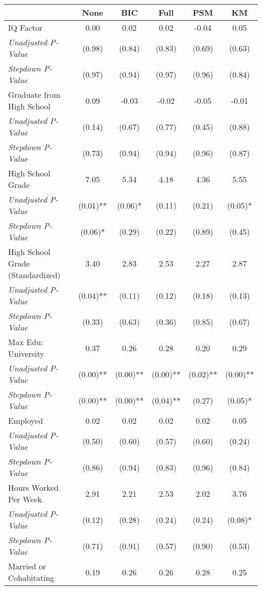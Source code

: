 \begin{tabular}{l c c c c c}
\toprule
 & None & BIC & Full & PSM & KM \\
\midrule
IQ Factor & 0.00 & 0.02 & 0.02 & -0.04 & 0.05 \\
\quad \textit{Unadjusted P-Value} & (0.98) & (0.84) & (0.83) & (0.69) & (0.63) \\
\quad \textit{Stepdown P-Value} & (0.97) & (0.94) & (0.97) & (0.96) & (0.84) \\
Graduate from High School & 0.09 & -0.03 & -0.02 & -0.05 & -0.01 \\
\quad \textit{Unadjusted P-Value} & (0.14) & (0.67) & (0.77) & (0.45) & (0.88) \\
\quad \textit{Stepdown P-Value} & (0.73) & (0.94) & (0.94) & (0.96) & (0.87) \\
High School Grade & 7.05 & 5.34 & 4.18 & 4.36 & 5.55 \\
\quad \textit{Unadjusted P-Value} & (0.01)** & (0.06)* & (0.11) & (0.21) & (0.05)* \\
\quad \textit{Stepdown P-Value} & (0.06)* & (0.29) & (0.22) & (0.89) & (0.45) \\
High School Grade (Standardized) & 3.40 & 2.83 & 2.53 & 2.27 & 2.87 \\
\quad \textit{Unadjusted P-Value} & (0.04)** & (0.11) & (0.12) & (0.18) & (0.13) \\
\quad \textit{Stepdown P-Value} & (0.33) & (0.63) & (0.36) & (0.85) & (0.67) \\
Max Edu: University & 0.37 & 0.26 & 0.28 & 0.20 & 0.29 \\
\quad \textit{Unadjusted P-Value} & (0.00)** & (0.00)** & (0.00)** & (0.02)** & (0.00)** \\
\quad \textit{Stepdown P-Value} & (0.00)** & (0.00)** & (0.04)** & (0.27) & (0.05)* \\
Employed & 0.02 & 0.02 & 0.02 & 0.02 & 0.05 \\
\quad \textit{Unadjusted P-Value} & (0.50) & (0.60) & (0.57) & (0.60) & (0.24) \\
\quad \textit{Stepdown P-Value} & (0.86) & (0.94) & (0.83) & (0.96) & (0.84) \\
Hours Worked Per Week & 2.91 & 2.21 & 2.53 & 2.02 & 3.76 \\
\quad \textit{Unadjusted P-Value} & (0.12) & (0.28) & (0.24) & (0.24) & (0.08)* \\
\quad \textit{Stepdown P-Value} & (0.71) & (0.91) & (0.57) & (0.90) & (0.53) \\
Married or Cohabitating & 0.19 & 0.26 & 0.26 & 0.28 & 0.25 \\

\end{tabular}

